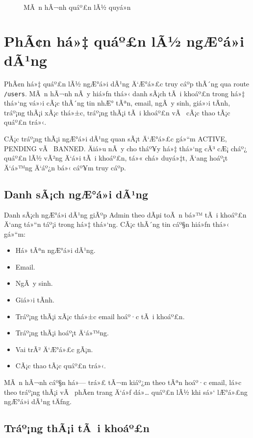 ﻿\documentclass[12pt,a4paper]{report}
\begin{document}
\begin{figure}[H]
    \centering
    \caption{MÃ n hÃ¬nh quáº£n lÃ½ quyá»n}
    \label{fig:permissions-management}
\end{figure}

\section{PhÃ¢n há»‡ quáº£n lÃ½ ngÆ°á»i dÃ¹ng}

PhÃ¢n há»‡ quáº£n lÃ½ ngÆ°á»i dÃ¹ng Ä‘Æ°á»£c truy cáº­p thÃ´ng qua route \texttt{/users}. MÃ n hÃ¬nh nÃ y hiá»ƒn thá»‹ danh sÃ¡ch tÃ i khoáº£n trong há»‡ thá»‘ng vá»›i cÃ¡c thÃ´ng tin nhÆ° tÃªn, email, ngÃ y sinh, giá»›i tÃ­nh, tráº¡ng thÃ¡i xÃ¡c thá»±c, tráº¡ng thÃ¡i tÃ i khoáº£n vÃ  cÃ¡c thao tÃ¡c quáº£n trá»‹.

CÃ¡c tráº¡ng thÃ¡i ngÆ°á»i dÃ¹ng quan sÃ¡t Ä‘Æ°á»£c gá»“m ACTIVE, PENDING vÃ  BANNED. Äiá»u nÃ y cho tháº¥y há»‡ thá»‘ng cÃ³ cÆ¡ cháº¿ quáº£n lÃ½ vÃ²ng Ä‘á»i tÃ i khoáº£n, tá»« chá» duyá»‡t, Ä‘ang hoáº¡t Ä‘á»™ng Ä‘áº¿n bá»‹ cáº¥m truy cáº­p.

\subsection{Danh sÃ¡ch ngÆ°á»i dÃ¹ng}

Danh sÃ¡ch ngÆ°á»i dÃ¹ng giÃºp Admin theo dÃµi toÃ n bá»™ tÃ i khoáº£n Ä‘ang tá»“n táº¡i trong há»‡ thá»‘ng. CÃ¡c thÃ´ng tin cáº§n hiá»ƒn thá»‹ gá»“m:

\begin{itemize}
    \item Há» tÃªn ngÆ°á»i dÃ¹ng.
    \item Email.
    \item NgÃ y sinh.
    \item Giá»›i tÃ­nh.
    \item Tráº¡ng thÃ¡i xÃ¡c thá»±c email hoáº·c tÃ i khoáº£n.
    \item Tráº¡ng thÃ¡i hoáº¡t Ä‘á»™ng.
    \item Vai trÃ² Ä‘Æ°á»£c gÃ¡n.
    \item CÃ¡c thao tÃ¡c quáº£n trá»‹.
\end{itemize}

MÃ n hÃ¬nh cáº§n há»— trá»£ tÃ¬m kiáº¿m theo tÃªn hoáº·c email, lá»c theo tráº¡ng thÃ¡i vÃ  phÃ¢n trang Ä‘á»ƒ dá»… quáº£n lÃ½ khi sá»‘ lÆ°á»£ng ngÆ°á»i dÃ¹ng tÄƒng.

\subsection{Tráº¡ng thÃ¡i tÃ i khoáº£n}
\end{document}
